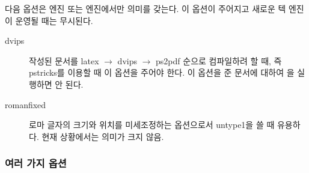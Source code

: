 \documentclass[
	12pt,
	a4paper,
	kosection,
	footnote,
	microtype,
	figtabcapt,
]{oblivoir}
\newcommand\obclass{ob\-liv\-oir\oblivoirallowbreak}
\begin{document}
다음 옵션은  엔진 또는  엔진에서만 의미를 갖는다. 이 옵션이 주어지고
새로운 텍 엔진이 운영될 때는 무시된다.
\begin{description}
\item [dvips]  작성된 문서를 latex $\rightarrow$ dvips $\rightarrow$ ps2pdf 순으로
컴파일하려 할 때, 즉 pstricks를 이용할 때 이 옵션을 주어야 한다. 이 옵션을 준 문서에 대하여 을 
실행하면 안 된다.
\item [romanfixed] 로마 글자의 크기와 위치를 미세조정하는 옵션으로서 untype1을 쓸 때 유용하다. 현재 상황에서는 의미가 크지 않음.
\end{description}

\subsubsection{여러 가지 옵션}
\end{document}
